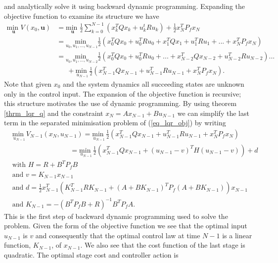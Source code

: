 and analytically solve it using backward dynamic programming. Expanding the objective function to examine its structure we have
\begin{equation}
\begin{aligned}
\underset{\mathbf{u}}{\text{min }} V(x_0, \mathbf{u}) &= \underset{\mathbf{u}}{\text{min }} \frac{1}{2}\sum_{k=0}^{N-1} \left( x_k^TQx_k + u_k^tRu_k \right) + \frac{1}{2}x_N^TP_fx_N \\
&= \underset{u_0, u_1,...,u_{N-1}}{\text{min }}  \frac{1}{2}\left( x_0^TQx_0 + u_0^TRu_0 +x_1^TQx_1 + u_1^TRu_1 + ... + x_N^TP_fx_N \right) \\
&= \underset{u_0, u_1,...,u_{N-2}}{\text{min }}  \frac{1}{2}\left( x_0^TQx_0 + u_0^TRu_0 + ... + x_{N-2}^TQx_{N-2} + u_{N-2}^TRu_{N-2} \right)... \\
& \hspace{18pt} + \underset{u_{N-1}}{\text{min }} \frac{1}{2} \left(x_{N-1}^TQx_{N-1}+ u_{N-1}^TRu_{N-1} + x_N^TP_fx_N\right).
\end{aligned}
\label{eq_lqr_expand_obj}
\end{equation}
Note that given $x_0$ and the system dynamics all succeeding states are unknown only in the control input. The expansion of the objective function is recursive; this structure motivates the use of dynamic programming. By using theorem \ref{thrm_lqr_q} and the constraint $x_N=Ax_{N-1}+Bu_{N-1}$ we can simplify the last term in the separated minimisation problem of (\ref{eq_lqr_obj}) by writing
\begin{equation}
\begin{aligned}
&\underset{u_{N-1}}{\text{min }}V_{N-1}(x_N, u_{N-1}) =\underset{u_{N-1}}{\text{min }} \frac{1}{2} \left(x_{N-1}^TQx_{N-1}+ u_{N-1}^TRu_{N-1} + x_N^TP_fx_N\right) \\ 
&\hspace{100pt} = \underset{u_{N-1}}{\text{min }}\frac{1}{2} \left(x_{N-1}^TQx_{N-1} + (u_{N-1}-v)^TH(u_{N-1}-v)\right) + d \\
&\text{with } H = R+B^TP_fB \\
&\text{and } v = K_{N-1}x_{N-1} \\
&\text{and } d = \frac{1}{2}x_{N-1}^T\left(K_{N-1}^TRK_{N-1}+(A+BK_{N-1})^TP_f(A+BK_{N-1})  \right)x_{N-1}\\
&\text{and } K_{N-1} = -(B^TP_fB+R)^{-1}B^TP_fA.
\end{aligned}
\label{eq_lqr_sum_q}
\end{equation}
This is the first step of backward dynamic programming used to solve the problem. Given the form of the objective function we see that the optimal input $u_{N-1}$ is $v$ and consequently that the optimal control law at time $N-1$ is a linear function, $K_{N-1}$, of $x_{N-1}$. We also see that the cost function of the last stage is quadratic. The optimal stage cost and controller action is
